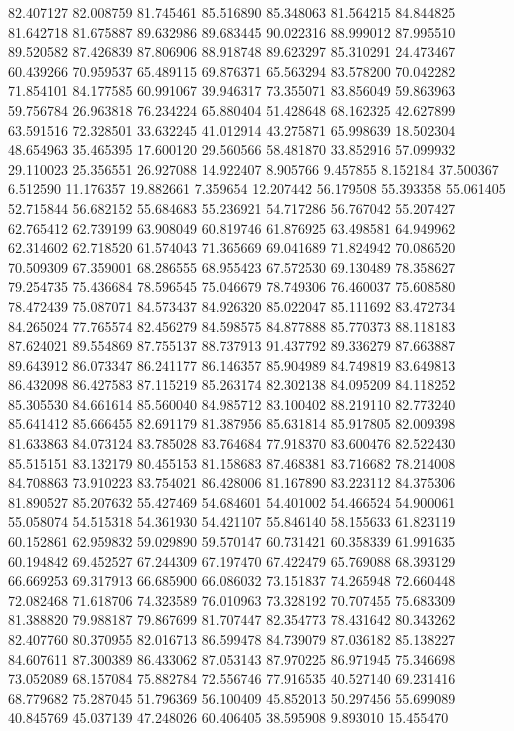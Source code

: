 82.407127
82.008759
81.745461
85.516890
85.348063
81.564215
84.844825
81.642718
81.675887
89.632986
89.683445
90.022316
88.999012
87.995510
89.520582
87.426839
87.806906
88.918748
89.623297
85.310291
24.473467
60.439266
70.959537
65.489115
69.876371
65.563294
83.578200
70.042282
71.854101
84.177585
60.991067
39.946317
73.355071
83.856049
59.863963
59.756784
26.963818
76.234224
65.880404
51.428648
68.162325
42.627899
63.591516
72.328501
33.632245
41.012914
43.275871
65.998639
18.502304
48.654963
35.465395
17.600120
29.560566
58.481870
33.852916
57.099932
29.110023
25.356551
26.927088
14.922407
8.905766
9.457855
8.152184
37.500367
6.512590
11.176357
19.882661
7.359654
12.207442
56.179508
55.393358
55.061405
52.715844
56.682152
55.684683
55.236921
54.717286
56.767042
55.207427
62.765412
62.739199
63.908049
60.819746
61.876925
63.498581
64.949962
62.314602
62.718520
61.574043
71.365669
69.041689
71.824942
70.086520
70.509309
67.359001
68.286555
68.955423
67.572530
69.130489
78.358627
79.254735
75.436684
78.596545
75.046679
78.749306
76.460037
75.608580
78.472439
75.087071
84.573437
84.926320
85.022047
85.111692
83.472734
84.265024
77.765574
82.456279
84.598575
84.877888
85.770373
88.118183
87.624021
89.554869
87.755137
88.737913
91.437792
89.336279
87.663887
89.643912
86.073347
86.241177
86.146357
85.904989
84.749819
83.649813
86.432098
86.427583
87.115219
85.263174
82.302138
84.095209
84.118252
85.305530
84.661614
85.560040
84.985712
83.100402
88.219110
82.773240
85.641412
85.666455
82.691179
81.387956
85.631814
85.917805
82.009398
81.633863
84.073124
83.785028
83.764684
77.918370
83.600476
82.522430
85.515151
83.132179
80.455153
81.158683
87.468381
83.716682
78.214008
84.708863
73.910223
83.754021
86.428006
81.167890
83.223112
84.375306
81.890527
85.207632
55.427469
54.684601
54.401002
54.466524
54.900061
55.058074
54.515318
54.361930
54.421107
55.846140
58.155633
61.823119
60.152861
62.959832
59.029890
59.570147
60.731421
60.358339
61.991635
60.194842
69.452527
67.244309
67.197470
67.422479
65.769088
68.393129
66.669253
69.317913
66.685900
66.086032
73.151837
74.265948
72.660448
72.082468
71.618706
74.323589
76.010963
73.328192
70.707455
75.683309
81.388820
79.988187
79.867699
81.707447
82.354773
78.431642
80.343262
82.407760
80.370955
82.016713
86.599478
84.739079
87.036182
85.138227
84.607611
87.300389
86.433062
87.053143
87.970225
86.971945
75.346698
73.052089
68.157084
75.882784
72.556746
77.916535
40.527140
69.231416
68.779682
75.287045
51.796369
56.100409
45.852013
50.297456
55.699089
40.845769
45.037139
47.248026
60.406405
38.595908
9.893010
15.455470
